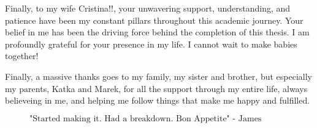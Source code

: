Finally, to my wife Cristina!!, your unwavering support, understanding, and patience have been my constant pillars throughout this academic journey. Your belief in me has been the driving force behind the completion of this thesis. I am profoundly grateful for your presence in my life. I cannot wait to make babies together!

Finally, a massive thanks goes to my family, my sister and brother, but especially my parents, Katka and Marek, for all the support through my entire life, always believeing in me, and helping me follow things that make me happy and fulfilled.

\begin{figure}[b]
$$\mbox{"Started making it. Had a breakdown. Bon Appetite" - James Acaster}$$
\end{figure}

